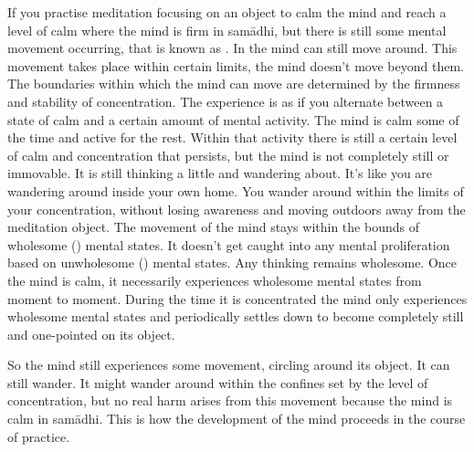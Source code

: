If you practise meditation focusing on an object to calm the mind and reach a level of calm where the mind is firm in sam\=adhi, but there is still some mental movement occurring, that is known as . In  the mind can still move around. This movement takes place within certain limits, the mind doesn't move beyond them. The boundaries within which the mind can move are determined by the firmness and stability of concentration. The experience is as if you alternate between a state of calm and a certain amount of mental activity. The mind is calm some of the time and active for the rest. Within that activity there is still a certain level of calm and concentration that persists, but the mind is not completely still or immovable. It is still thinking a little and wandering about. It's like you are wandering around inside your own home. You wander around within the limits of your concentration, without losing awareness and moving outdoors away from the meditation object. The movement of the mind stays within the bounds of wholesome () mental states. It doesn't get caught into any mental proliferation based on unwholesome () mental states. Any thinking remains wholesome. Once the mind is calm, it necessarily experiences wholesome mental states from moment to moment. During the time it is concentrated the mind only experiences wholesome mental states and periodically settles down to become completely still and one-pointed on its object.

So the mind still experiences some movement, circling around its object. It can still wander. It might wander around within the confines set by the level of concentration, but no real harm arises from this movement because the mind is calm in sam\=adhi. This is how the development of the mind proceeds in the course of practice. 

